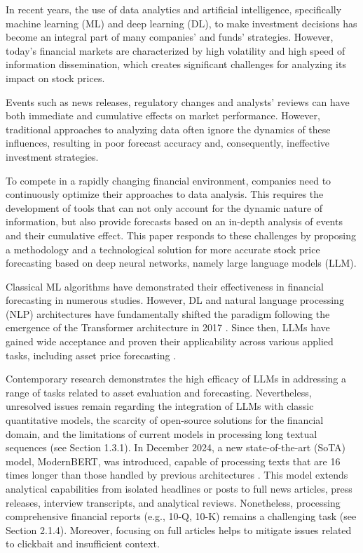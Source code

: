 In recent years, the use of data analytics and artificial intelligence, specifically machine learning (ML) and deep learning (DL),
to make investment decisions has become an integral part of many companies' and funds' strategies. However, today's financial
markets are characterized by high volatility and high speed of information dissemination, which creates significant challenges
for analyzing its impact on stock prices.

Events such as news releases, regulatory changes and analysts' reviews can have both immediate and cumulative effects
on market performance. However, traditional approaches to analyzing data often ignore the dynamics of these influences,
resulting in poor forecast accuracy and, consequently, ineffective investment strategies.

To compete in a rapidly changing financial environment, companies need to continuously optimize their approaches to data analysis.
This requires the development of tools that can not only account for the dynamic nature of information, but also provide forecasts
based on an in-depth analysis of events and their cumulative effect. This paper responds to these challenges by proposing
a methodology and a technological solution for more accurate stock price forecasting based on deep neural networks,
namely large language models (LLM).

Classical ML algorithms have demonstrated their effectiveness in financial forecasting in numerous studies.
However, DL and natural language processing (NLP) architectures have fundamentally shifted the paradigm following
the emergence of the Transformer architecture in 2017 \parencite{vaswani2017attention}. Since then, LLMs
have gained wide acceptance and proven their applicability across various applied tasks, including asset price forecasting
\parencite{Jiang2023, Halder2022, Kim2023}.

Contemporary research demonstrates the high efficacy of LLMs in addressing a range of tasks related to asset evaluation and forecasting.
Nevertheless, unresolved issues remain regarding the integration of LLMs with classic quantitative models, the scarcity of open-source
solutions for the financial domain, and the limitations of current models in processing long textual sequences (see Section 1.3.1).
In December 2024, a new state-of-the-art (SoTA) model, ModernBERT, was introduced, capable of processing texts that are 16 times longer
than those handled by previous architectures \parencite{Warner2024ModernBERT, devlin2019BERT}. This model extends analytical capabilities
from isolated headlines or posts to full news articles, press releases, interview transcripts, and analytical reviews. Nonetheless,
processing comprehensive financial reports (e.g., 10-Q, 10-K) remains a challenging task (see Section 2.1.4). Moreover,
focusing on full articles helps to mitigate issues related to clickbait and insufficient context.


